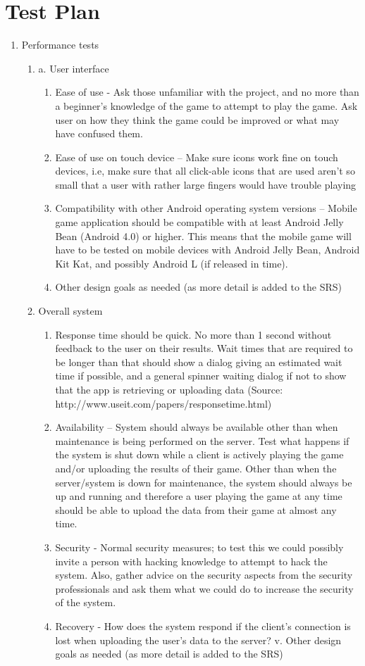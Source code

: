 \documentclass[a4wide]{article}
\begin{document}
\section{Test Plan}
\begin{enumerate}
\item Performance tests
\begin{enumerate}


\item a.	User interface
\begin{enumerate}
\item	Ease of use - Ask those unfamiliar with the project, and no more than a beginner’s knowledge of the game to attempt to play the game. Ask user on how they think the game could be improved or what may have confused them.
\item	Ease of use on touch device – Make sure icons work fine on touch devices, i.e, make sure that all click-able icons that are used aren't so small that a user with rather large fingers would have trouble playing
\item	Compatibility with other Android operating system versions – Mobile game application should be compatible with at least Android Jelly Bean (Android 4.0) or higher. This means that the mobile game will have to be tested on mobile devices with Android Jelly Bean, Android Kit Kat, and possibly Android L (if released in time).
\item 	Other design goals as needed (as more detail is added to the SRS)
\end{enumerate}
\item	Overall system
\begin{enumerate}
\item	 Response time should be quick. No more than 1 second without feedback to the user on their results. Wait times that are required to be longer than that should show a dialog giving an estimated wait time if possible, and a general spinner waiting dialog if not  to show that the app is retrieving or uploading data (Source: http://www.useit.com/papers/responsetime.html)
\item	Availability – System should always be available other than when maintenance is being performed on the server. Test what happens if the system is shut down while a client is actively playing the game and/or uploading the results of their game. Other than when the server/system is down for maintenance, the system should always be up and running and therefore a user playing the game at any time should be able to upload the data from their game at almost any time.
\item	Security - Normal security measures; to test this we could possibly invite a person with hacking knowledge to attempt to hack the system. Also, gather advice on the security aspects from the security professionals  and ask them what we could do to increase the security of the system.
\item	Recovery - How does the system respond if the client’s connection is lost when uploading the user’s data to the server?
v.	Other design goals as needed (as more detail is added to the SRS)
\end{enumerate}


\end{enumerate}
\end{enumerate}
\end{document}
